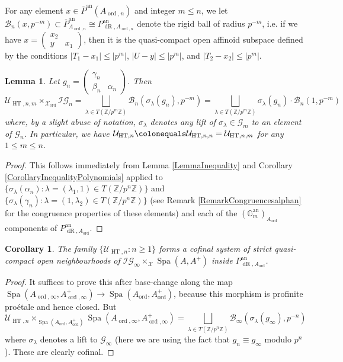 \documentclass[10pt, oneside]{amsart}
\newcommand{\defeq}{\colonequals}
\numberwithin{equation}{subsection}
\newtheorem{lemma}[equation]{Lemma}
\newtheorem{corollary}[equation]{Corollary}
\theoremstyle{definition}
\theoremstyle{remark}
\newcommand{\mbb}[1]{\mathbb{#1}}
\newcommand{\opn}[1]{\operatorname{#1}}
\newcommand{\tbyt}[4]{\left( \begin{matrix} #1 & #2 \\ #3 & #4 \end{matrix} \right)}
\def\Z{{\mathbb{Z}}}
\begin{document}
For any element $x \in \overline{P}^{\opn{an}}(A_{\opn{ord}, n})$ and integer $m \leq n$, we let $\mathcal{B}_n(x, p^{-m}) \subset \overline{P}^{\opn{an}}_{A_{\opn{ord}, n}} \cong P_{\opn{dR}, A_{\opn{ord}, n}}^{\opn{an}}$ denote the rigid ball of radius $p^{-m}$, i.e. if we have $x = \tbyt{x_2}{}{y}{x_1}$, then it is the quasi-compact open affinoid subspace defined by the conditions $|T_1 - x_1| \leq |p^{m}|$, $|U - y| \leq |p^{m}|$, and $|T_2 - x_2| \leq |p^{m}|$.

\begin{lemma} \label{DecompositionIntoBallsLemma}
Let $g_n = \tbyt{\gamma_n}{}{\beta_n}{\alpha_n}$. Then
\[ \mathcal{U}_{\opn{HT}, n, m} \times_{\mathcal{X}_{\opn{ord}}} \mathcal{IG}_n = \bigsqcup_{\lambda \in T(\Z / p^m \Z)} \mathcal{B}_n(\sigma_\lambda(g_n), p^{-m}) = \bigsqcup_{\lambda \in T(\Z / p^m \Z)} \sigma_\lambda(g_n) \cdot \mathcal{B}_n(1, p^{-m}) \]
where, by a slight abuse of notation, $\sigma_\lambda$ denotes any lift of $\sigma_\lambda \in \mathscr{G}_m$ to an element of $\mathscr{G}_n$. In particular, we have $\mathcal{U}_{\opn{HT}, n} \defeq \mathcal{U}_{\opn{HT}, n, n} = \mathcal{U}_{\opn{HT}, n, m}$ for any $1 \leq m \leq n$.
\end{lemma}

\begin{proof}
This follows immediately from Lemma \ref{LemmaInequality} and Corollary \ref{CorollaryInequalityPolynomials} applied to $\{ \sigma_\lambda(\alpha_n) : \lambda = (\lambda_1, 1) \in T(\Z / p^n \Z) \}$ and $\{ \sigma_\lambda(\gamma_n) : \lambda = (1, \lambda_2) \in T(\Z / p^n \Z) \}$ (see Remark \ref{RemarkCongruencesalphan} for the congruence properties of these elements) and each of the $(\mbb{G}_m^{\opn{an}})_{A_{\opn{ord}}}$ components of $P_{\opn{dR}, A_{\opn{ord}}}^{\opn{an}}$.
\end{proof}

\begin{corollary} \label{OCextensionsarecofinalCorollary}
The family $\{ \mathcal{U}_{\opn{HT}, n} : n \geq 1 \} $ forms a cofinal system of strict quasi-compact open neighbourhoods of $\mathcal{IG}_{\infty} \times_{\mathcal{X}} \opn{Spa}(A, A^+)$ inside $P_{\opn{dR}, A_{\opn{ord}}}^{\opn{an}}$.
\end{corollary}

\begin{proof}
It suffices to prove this after base-change along the map $\opn{Spa}(A_{\opn{ord}, \infty}, A_{\opn{ord}, \infty}^+) \to \opn{Spa}(A_{\opn{ord}}, A_{\opn{ord}}^+)$, because this morphism is profinite pro\'{e}tale and hence closed. But
\[
\mathcal{U}_{\opn{HT}, n} \times_{\opn{Spa}(A_{\opn{ord}}, A_{\opn{ord}}^+)} \opn{Spa}(A_{\opn{ord}, \infty}, A_{\opn{ord}, \infty}^+) = \bigsqcup_{\lambda \in T(\mbb{Z}/p^n\mbb{Z})} \mathcal{B}_{\infty}(\sigma_{\lambda}(g_{\infty}), p^{-n})
\]
where $\sigma_{\lambda}$ denotes a lift to $\mathscr{G}_{\infty}$ (here we are using the fact that $g_n \equiv g_{\infty}$ modulo $p^n$). These are clearly cofinal.
\end{proof}
\end{document}
